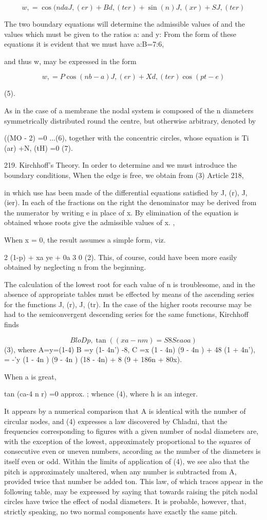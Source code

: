 \[w, = \cos(nd a J, (er) + Bd, (ter) + \sin(n) J, (xr) + SJ, (ter)\]

The two boundary equations will determine the admissible values of and
the values which must be given to the ratios a: and y: From the form of
these equations it is evident that we must have a:B=7:6,

and thus w, may be expressed in the form

\[w, = P \cos(nb - a) J, (er) + Xd, (ter) \cos(pt-e)\]

(5).

As in the case of a membrane the nodal system is composed of the n
diameters symmetrically distributed round the centre, but otherwise
arbitrary, denoted by

((MO - 2) =0 ...(6), together with the concentric circles, whose
equation is Ti (ar) +N, (tH) =0 (7).

219. Kirchhoff's Theory. %
In order to determine and we must introduce the boundary
conditions, When the edge is free, we obtain from (3) Article 218,

in which use has been made of the differential equations satisfied by J,
(r), J, (ier). In each of the fractions on the right the denominator may
be derived from the numerator by writing e in place of x. By elimination
of the equation is obtained whose roots give the admissible values of x.
,

When x = 0, the result assumes a simple form, viz.

2 (1-p) + xa ye + 0a 3 0 (2). This, of course, could have been more
easily obtained by neglecting n from the beginning.

The calculation of the lowest root for each value of n is troublesome,
and in the absence of appropriate tables must be effected by means of
the ascending series for the functions J, (r), J, (tr). In the case of
the higher roots recourse may be had to the semiconvergent descending
series for the same functions, Kirchhoff finds

\[ Blo Dp, \tan((xa - nm) = S8 Sea oa) \]
(3), where A=y=(1-4) B =y (1- 4n') -8, C =x (1 - 4n) (9 - 4n ) + 48 (1 +
4n'), = -'y (1 - 4n ) (9 - 4n ) (18 - 4n) + 8 (9 + 186n + 80x).


When a is great,

tan (ca-4 n r) =0 approx. ; whence (4), where h is an integer.

It appears by a numerical comparison that A is identical with the number
of circular nodes, and (4) expresses a law discovered by Chladni, that
the frequencies corresponding to figures with a given number of nodal
diameters are, with the exception of the lowest, approximately
proportional to the squares of consecutive even or uneven numbers,
according as the number of the diameters is itself even or odd. Within
the limits of application of (4), we see also that the pitch is
approximately unaltered, when any number is subtracted from A, provided
twice that number be added ton. This law, of which traces appear in the
following table, may be expressed by saying that towards raising the
pitch nodal circles have twice the effect of nodal diameters. It is
probable, however, that, strictly speaking, no two normal components
have exactly the same pitch.

